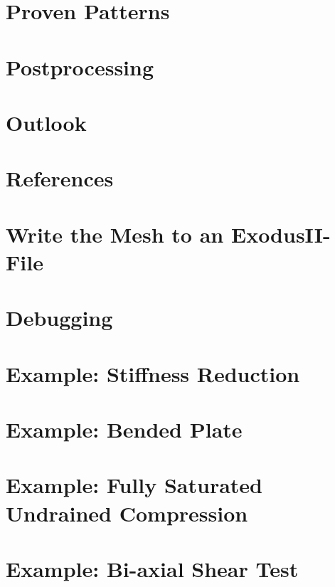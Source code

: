\documentclass[12pt]{report}
\begin{document}
\chapter{Proven Patterns}
\label{chap:patterns}


\chapter{Postprocessing}
\label{chap:postprocessing}


\chapter{Outlook}
\label{chap:outlook}


\chapter{References}
\label{chap:references}


\begin{appendices}

    \chapter{Write the Mesh to an ExodusII-File}
    \label{app:mesh-to-exodus}
    

    \chapter{Debugging}
    \label{app:debugging}
    

    \chapter{Example: Stiffness Reduction}
    \label{app:stiffness-reduction}
    

    \chapter{Example: Bended Plate}
    \label{app:bended-plate}
    

    \chapter{Example: Fully Saturated Undrained Compression}
    \label{app:fully-saturated-undrained-compression}
    

    \chapter{Example: Bi-axial Shear Test}
    \label{app:bi-axial-shear}
    

\end{appendices}
\end{document}
